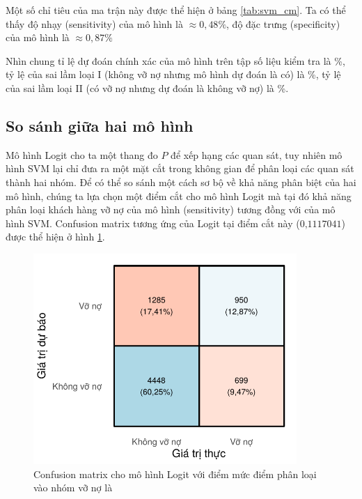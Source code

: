 \documentclass[a4paper]{report}\usepackage[]{graphicx}\usepackage[]{color}
\newenvironment{knitrout}{}{} %
\begin{document}
Một số chỉ tiêu của ma trận này được thể hiện ở bảng \ref{tab:svm_cm}. Ta có thể thấy độ nhạy (sensitivity) của mô hình là $\approx 0,48 \%$, độ đặc trưng (specificity) của mô hình là $\approx 0,87 \%$


Nhìn chung tỉ lệ dự đoán chính xác của mô hình trên tập số liệu kiểm tra là \%, tỷ lệ của sai lầm loại I (không vỡ nợ nhưng mô hình dự đoán là có) là \%, tỷ lệ của sai lầm loại II (có vỡ nợ nhưng dự đoán là không vỡ nợ) là \%.



\subsection{So sánh giữa hai mô hình}




Mô hình Logit cho ta một thang đo $P$ để xếp hạng các quan sát, tuy nhiên mô hình SVM lại chỉ đưa ra một mặt cắt trong không gian để phân loại các quan sát thành hai nhóm. Để có thể so sánh một cách sơ bộ về khả năng phân biệt của hai mô hình, chúng ta lựa chọn một điểm cắt cho mô hình Logit mà tại đó khả năng phân loại khách hàng vỡ nợ của mô hình (sensitivity) tương đồng với của mô hình SVM. Confusion matrix tương ứng của Logit tại điểm cắt này ($\text{0,1117041}$) được thể hiện ở hình \ref{fig:lasso_confusion_mat}.



\begin{figure}[h]
\centering
\capstart
\begin{knitrout}\small
{}\color{fgcolor}
\includegraphics[width=10cm]{Figures/lasso_confusion_mat-1} 

\end{knitrout}
\caption[Confusion matrix cho mô hình Logit]{Confusion matrix cho mô hình Logit với điểm mức điểm phân loại vào nhóm vỡ nợ là }
\label{fig:lasso_confusion_mat}
\end{figure}
\end{document}
